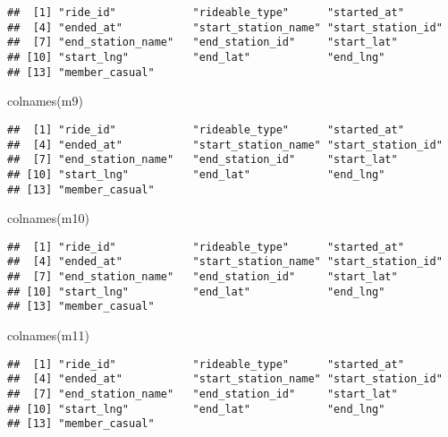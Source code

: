 \documentclass[
]{article}
\newenvironment{Shaded}{\begin{snugshade}}{\end{snugshade}}
\newcommand{\FunctionTok}[1]{\textcolor[rgb]{0.00,0.00,0.00}{#1}}
\newcommand{\NormalTok}[1]{#1}
\begin{document}
\begin{verbatim}
##  [1] "ride_id"            "rideable_type"      "started_at"        
##  [4] "ended_at"           "start_station_name" "start_station_id"  
##  [7] "end_station_name"   "end_station_id"     "start_lat"         
## [10] "start_lng"          "end_lat"            "end_lng"           
## [13] "member_casual"
\end{verbatim}

\begin{Shaded}
\begin{Highlighting}[]
\FunctionTok{colnames}\NormalTok{(m9)}
\end{Highlighting}
\end{Shaded}

\begin{verbatim}
##  [1] "ride_id"            "rideable_type"      "started_at"        
##  [4] "ended_at"           "start_station_name" "start_station_id"  
##  [7] "end_station_name"   "end_station_id"     "start_lat"         
## [10] "start_lng"          "end_lat"            "end_lng"           
## [13] "member_casual"
\end{verbatim}

\begin{Shaded}
\begin{Highlighting}[]
\FunctionTok{colnames}\NormalTok{(m10)}
\end{Highlighting}
\end{Shaded}

\begin{verbatim}
##  [1] "ride_id"            "rideable_type"      "started_at"        
##  [4] "ended_at"           "start_station_name" "start_station_id"  
##  [7] "end_station_name"   "end_station_id"     "start_lat"         
## [10] "start_lng"          "end_lat"            "end_lng"           
## [13] "member_casual"
\end{verbatim}

\begin{Shaded}
\begin{Highlighting}[]
\FunctionTok{colnames}\NormalTok{(m11)}
\end{Highlighting}
\end{Shaded}

\begin{verbatim}
##  [1] "ride_id"            "rideable_type"      "started_at"        
##  [4] "ended_at"           "start_station_name" "start_station_id"  
##  [7] "end_station_name"   "end_station_id"     "start_lat"         
## [10] "start_lng"          "end_lat"            "end_lng"           
## [13] "member_casual"
\end{verbatim}
\end{document}

